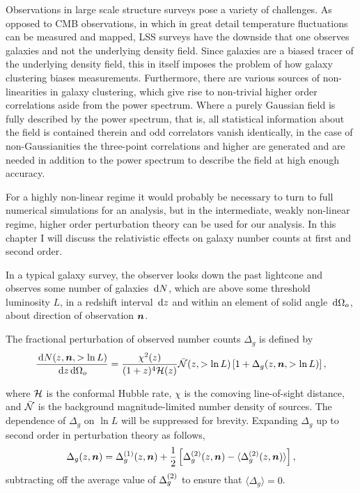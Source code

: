 {%

Observations in large scale structure surveys pose a variety of challenges. As opposed to CMB observations, in which in great detail temperature fluctuations can be measured and mapped, LSS surveys have the downside that one observes galaxies and not the underlying density field. Since galaxies are a biased tracer of the underlying density field, this in itself imposes the problem of how galaxy clustering biases measurements. Furthermore, there are various sources of non-linearities in galaxy clustering, which give rise to non-trivial higher order correlations aside from the power spectrum. Where a purely Gaussian field is fully described by the power spectrum, that is, all statistical information about the field is contained therein and odd correlators vanish identically, in the case of non-Gaussianities the three-point correlations and higher are generated and are needed in addition to the power spectrum to describe the field at high enough accuracy. 

For a highly non-linear regime it would probably be necessary to turn to full numerical simulations for an analysis, but in the intermediate, weakly non-linear regime, higher order perturbation theory can be used for our analysis. In this chapter I will discuss the relativistic effects on galaxy number counts at first and second order.  

In a typical galaxy survey, the observer looks down the past lightcone and observes some number of galaxies $\,\mathrm{d} N$, which are above some threshold luminosity $L$, in a redshift interval $\,\mathrm{d} z$ and within an element of solid angle $\,\mathrm{d} \Omega_o$, about direction of observation $\bm {n}$. 

The fractional perturbation of observed number counts $\Delta_g$ is defined by 
\begin{equation}
	\frac{\,\mathrm{d} N(z, \bm {n}, > \ln L)}{\,\mathrm{d} z \,\mathrm{d} \Omega_o} = \frac{\chi^2(z)}{(1 + z)^4 \mathcal{H}(z)} \bar{\mathcal{N}}(z, > \ln L) \left[ 1 + \Delta_g(z, \bm {n}, >\ln L)\right], 
\end{equation}

where $\mathcal{H}$ is the conformal Hubble rate, $\chi$ is the comoving line-of-sight distance, and $\bar{\mathcal{N}}$ is the background magnitude-limited number density of sources. The dependence of $\Delta_g$ on $\ln L$ will be suppressed for brevity. Expanding $\Delta_g$ up to second order in perturbation theory as follows, 
\begin{equation}
	\Delta_g(z,\bm {n}) = \Delta_g^{(1)}(z,\bm {n}) + \frac{1}{2} \left[ \Delta_g^{(2)}(z,\bm {n}) - \langle \Delta_g^{(2)} (z,\bm {n})\rangle \right],
\end{equation}
subtracting off the average value of $\Delta_g^{(2)}$ to ensure that $\langle \Delta_g \rangle = 0$.

}
